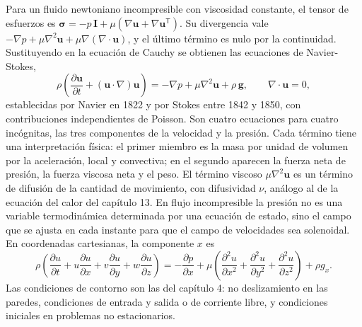 \documentclass[10pt,openany]{book}
\begin{document}
Para un fluido newtoniano incompresible con viscosidad constante, el tensor de esfuerzos es \(\boldsymbol{\sigma} = -p\,\mathbf{I} + \mu(\nabla\mathbf{u} + \nabla\mathbf{u}^{\mathsf{T}})\). Su divergencia vale \(-\nabla p + \mu\nabla^{2}\mathbf{u} + \mu\nabla(\nabla\cdot\mathbf{u})\), y el último término es nulo por la continuidad. Sustituyendo en la ecuación de Cauchy se obtienen las ecuaciones de Navier-Stokes,
\begin{equation}
\rho\left(\frac{\partial\mathbf{u}}{\partial t} + (\mathbf{u}\cdot\nabla)\mathbf{u}\right) = -\nabla p + \mu\nabla^{2}\mathbf{u} + \rho\,\mathbf{g}, \qquad \nabla\cdot\mathbf{u} = 0, \label{eq:c14-ns}
\end{equation}
establecidas por Navier en 1822 y por Stokes entre 1842 y 1850, con contribuciones independientes de Poisson. Son cuatro ecuaciones para cuatro incógnitas, las tres componentes de la velocidad y la presión. Cada término tiene una interpretación física: el primer miembro es la masa por unidad de volumen por la aceleración, local y convectiva; en el segundo aparecen la fuerza neta de presión, la fuerza viscosa neta y el peso. El término viscoso \(\mu\nabla^{2}\mathbf{u}\) es un término de difusión de la cantidad de movimiento, con difusividad \(\nu\), análogo al de la ecuación del calor del capítulo 13. En flujo incompresible la presión no es una variable termodinámica determinada por una ecuación de estado, sino el campo que se ajusta en cada instante para que el campo de velocidades sea solenoidal. En coordenadas cartesianas, la componente \(x\) es
\begin{equation}
\rho\left(\frac{\partial u}{\partial t} + u\frac{\partial u}{\partial x} + v\frac{\partial u}{\partial y} + w\frac{\partial u}{\partial z}\right) = -\frac{\partial p}{\partial x} + \mu\left(\frac{\partial^{2}u}{\partial x^{2}} + \frac{\partial^{2}u}{\partial y^{2}} + \frac{\partial^{2}u}{\partial z^{2}}\right) + \rho g_x. \label{eq:c14-ns-x}
\end{equation}
Las condiciones de contorno son las del capítulo 4: no deslizamiento en las paredes, condiciones de entrada y salida o de corriente libre, y condiciones iniciales en problemas no estacionarios.
\end{document}
